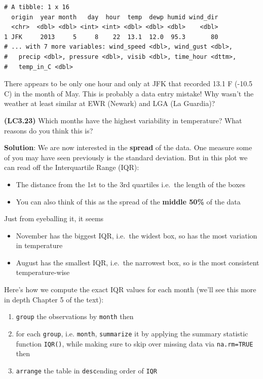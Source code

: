 \documentclass[12pt, krantz2,]{krantz}
\providecommand{\tightlist}{%
  \setlength{\itemsep}{0pt}\setlength{\parskip}{0pt}}
\begin{document}
\begin{verbatim}
# A tibble: 1 x 16
  origin  year month   day  hour  temp  dewp humid wind_dir
  <chr>  <dbl> <dbl> <int> <int> <dbl> <dbl> <dbl>    <dbl>
1 JFK     2013     5     8    22  13.1  12.0  95.3       80
# ... with 7 more variables: wind_speed <dbl>, wind_gust <dbl>,
#   precip <dbl>, pressure <dbl>, visib <dbl>, time_hour <dttm>,
#   temp_in_C <dbl>
\end{verbatim}

There appears to be only one hour and only at JFK that recorded 13.1 F (-10.5 C) in the month of May. This is probably a data entry mistake! Why wasn't the weather at least similar at EWR (Newark) and LGA (La Guardia)?

\textbf{(LC3.23)} Which months have the highest variability in temperature? What reasons do you think this is?

\textbf{Solution}: We are now interested in the \textbf{spread} of the data. One measure some of you may have seen previously is the standard deviation. But in this plot we can read off the Interquartile Range (IQR):

\begin{itemize}
\tightlist
\item
  The distance from the 1st to the 3rd quartiles i.e.~the length of the boxes
\item
  You can also think of this as the spread of the \textbf{middle 50\%} of the data
\end{itemize}

Just from eyeballing it, it seems

\begin{itemize}
\tightlist
\item
  November has the biggest IQR, i.e.~the widest box, so has the most variation in temperature
\item
  August has the smallest IQR, i.e.~the narrowest box, so is the most consistent temperature-wise
\end{itemize}

Here's how we compute the exact IQR values for each month (we'll see this more in depth Chapter 5 of the text):

\begin{enumerate}
\def\labelenumi{\arabic{enumi}.}
\tightlist
\item
  \texttt{group} the observations by \texttt{month} then
\item
  for each \texttt{group}, i.e. \texttt{month}, \texttt{summarize} it by applying the summary statistic function \texttt{IQR()}, while making sure to skip over missing data via \texttt{na.rm=TRUE} then
\item
  \texttt{arrange} the table in \texttt{desc}ending order of \texttt{IQR}
\end{enumerate}
\end{document}
